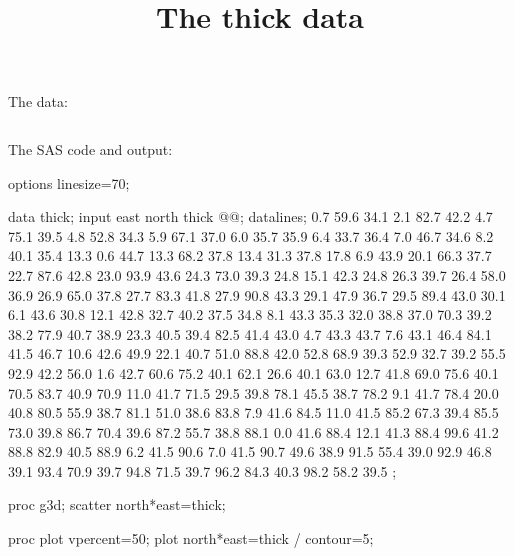 \documentclass{article}
\title{The thick data}
\begin{document}
\maketitle
The data:
\begin{verbatim}
\end{verbatim}
The SAS code and output:
\begin{Winput}
options linesize=70;

data thick; 
  input east north thick @@;
  datalines; 
   0.7  59.6  34.1   2.1  82.7  42.2   4.7  75.1  39.5  
   4.8  52.8  34.3   5.9  67.1  37.0   6.0  35.7  35.9 
   6.4  33.7  36.4   7.0  46.7  34.6   8.2  40.1  35.4    
  13.3   0.6  44.7  13.3  68.2  37.8  13.4  31.3  37.8 
  17.8   6.9  43.9  20.1  66.3  37.7  22.7  87.6  42.8  
  23.0  93.9  43.6  24.3  73.0  39.3  24.8  15.1  42.3 
  24.8  26.3  39.7  26.4  58.0  36.9  26.9  65.0  37.8  
  27.7  83.3  41.8  27.9  90.8  43.3  29.1  47.9  36.7 
  29.5  89.4  43.0  30.1   6.1  43.6  30.8  12.1  42.8 
  32.7  40.2  37.5  34.8   8.1  43.3  35.3  32.0  38.8 
  37.0  70.3  39.2  38.2  77.9  40.7  38.9  23.3  40.5 
  39.4  82.5  41.4  43.0   4.7  43.3  43.7   7.6  43.1 
  46.4  84.1  41.5  46.7  10.6  42.6  49.9  22.1  40.7 
  51.0  88.8  42.0  52.8  68.9  39.3  52.9  32.7  39.2 
  55.5  92.9  42.2  56.0   1.6  42.7  60.6  75.2  40.1 
  62.1  26.6  40.1  63.0  12.7  41.8  69.0  75.6  40.1 
  70.5  83.7  40.9  70.9  11.0  41.7  71.5  29.5  39.8 
  78.1  45.5  38.7  78.2   9.1  41.7  78.4  20.0  40.8 
  80.5  55.9  38.7  81.1  51.0  38.6  83.8   7.9  41.6 
  84.5  11.0  41.5  85.2  67.3  39.4  85.5  73.0  39.8  
  86.7  70.4  39.6  87.2  55.7  38.8  88.1   0.0  41.6 
  88.4  12.1  41.3  88.4  99.6  41.2  88.8  82.9  40.5  
  88.9   6.2  41.5  90.6   7.0  41.5  90.7  49.6  38.9  
  91.5  55.4  39.0  92.9  46.8  39.1  93.4  70.9  39.7  
  94.8  71.5  39.7  96.2  84.3  40.3  98.2  58.2  39.5 
;

proc g3d;
    scatter north*east=thick;

proc plot vpercent=50;
    plot north*east=thick / contour=5;
\end{Winput}
\end{document}
